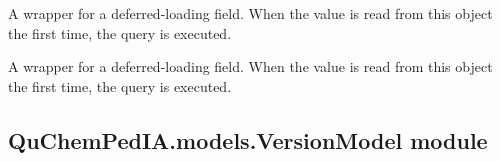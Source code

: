 \documentclass[letterpaper,10pt,english]{sphinxmanual}
\begin{document}
\begin{fulllineitems}

\begin{fulllineitems}
\label{\detokenize{QuChemPedIA.models:QuChemPedIA.models.UserModel.Utilisateur.objects}}
\end{fulllineitems}


\begin{fulllineitems}
\label{\detokenize{QuChemPedIA.models:QuChemPedIA.models.UserModel.Utilisateur.orcid}}
A wrapper for a deferred-loading field. When the value is read from this
object the first time, the query is executed.

\end{fulllineitems}


\begin{fulllineitems}
\label{\detokenize{QuChemPedIA.models:QuChemPedIA.models.UserModel.Utilisateur.staff}}
A wrapper for a deferred-loading field. When the value is read from this
object the first time, the query is executed.

\end{fulllineitems}


\end{fulllineitems}



\subsection{QuChemPedIA.models.VersionModel module}
\label{\detokenize{QuChemPedIA.models:module-QuChemPedIA.models.VersionModel}}\label{\detokenize{QuChemPedIA.models:quchempedia-models-versionmodel-module}}
\end{document}
